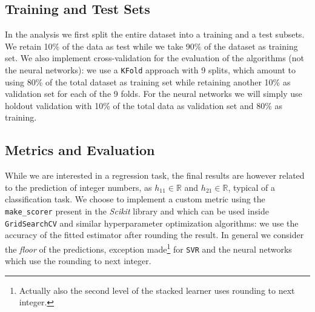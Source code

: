 \subsection{Training and Test Sets}
    In the analysis we first split the entire dataset into a training and a test subsets. We retain 10\% of the data as test while we take 90\% of the dataset as training set. We also implement cross-validation for the evaluation of the algorithms (not the neural networks): we use a \texttt{KFold} approach with 9 splits, which amount to using 80\% of the total dataset as training set while retaining another 10\% as validation set for each of the 9 folds. For the neural networks we will simply use holdout validation with 10\% of the total data as validation set and 80\% as training.
    
\subsection{Metrics and Evaluation}
    While we are interested in a regression task, the final results are however related to the prediction of integer numbers, as $h_{11} \in \mathds{R}$ and $h_{21} \in \mathds{R}$, typical of a classification task. We choose to implement a custom metric using the \texttt{make\_scorer} present in the \textit{Scikit} library and which can be used inside \texttt{GridSearchCV} and similar hyperparameter optimization algorithms: we use the accuracy of the fitted estimator after rounding the result. In general we consider the \textit{floor} of the predictions, exception made\footnote{Actually also the second level of the stacked learner uses rounding to next integer.} for \texttt{SVR} and the neural networks which use the rounding to next integer.

